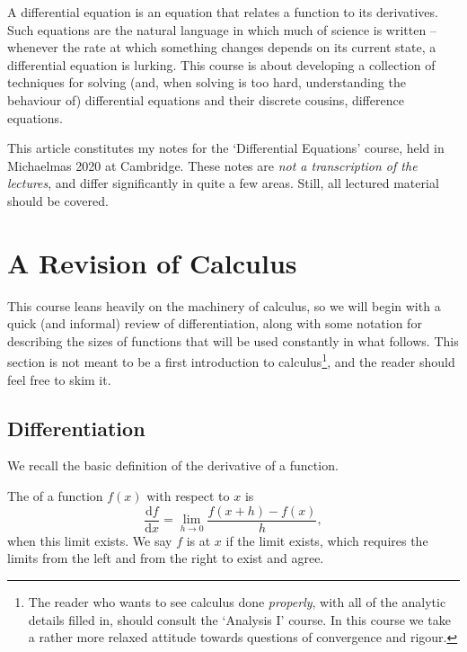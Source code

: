 



A differential equation is an equation that relates a function to its derivatives. Such equations are the natural language in which much of science is written -- whenever the rate at which something changes depends on its current state, a differential equation is lurking. This course is about developing a collection of techniques for solving (and, when solving is too hard, understanding the behaviour of) differential equations and their discrete cousins, difference equations.

This article constitutes my notes for the `Differential Equations' course, held in Michaelmas 2020 at Cambridge. These notes are \emph{not a transcription of the lectures}, and differ significantly in quite a few areas. Still, all lectured material should be covered.



\section{A Revision of Calculus}

This course leans heavily on the machinery of calculus, so we will begin with a quick (and informal) review of differentiation, along with some notation for describing the sizes of functions that will be used constantly in what follows. This section is not meant to be a first introduction to calculus\footnote{The reader who wants to see calculus done \emph{properly}, with all of the analytic details filled in, should consult the `Analysis I' course. In this course we take a rather more relaxed attitude towards questions of convergence and rigour.}, and the reader should feel free to skim it.

\subsection{Differentiation}

We recall the basic definition of the derivative of a function.

\begin{definition}[Derivative]
	The  of a function $f(x)$ with respect to $x$ is
	$$
	\frac{\mathrm{d}f}{\mathrm{d}x} = \lim_{h \to 0} \frac{f(x + h) - f(x)}{h},
	$$
	when this limit exists. We say $f$ is  at $x$ if the limit exists, which requires the limits from the left and from the right to exist and agree.
\end{definition}

